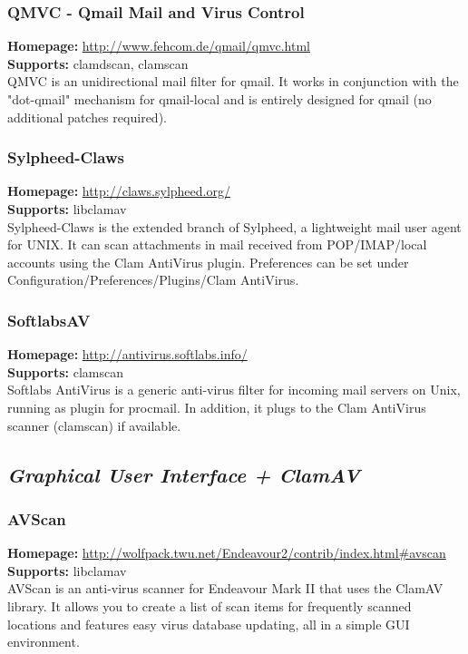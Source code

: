\documentclass[a4paper,titlepage,12pt]{article}
\begin{document}
    \subsubsection{QMVC - Qmail Mail and Virus Control}
    \textbf{Homepage:} \url{http://www.fehcom.de/qmail/qmvc.html}\\
    \textbf{Supports:} clamdscan, clamscan\\[4pt]
    QMVC is an unidirectional mail filter for qmail. It works in conjunction
    with the "dot-qmail" mechanism for qmail-local and is entirely designed
    for qmail (no additional patches required).

    \subsubsection{Sylpheed-Claws}
    \textbf{Homepage:} \url{http://claws.sylpheed.org/}\\
    \textbf{Supports:} libclamav\\[4pt]
    Sylpheed-Claws is the extended branch of Sylpheed, a lightweight mail user
    agent for UNIX. It can scan attachments in mail received from
    POP/IMAP/local accounts using the Clam AntiVirus plugin. Preferences can
    be set under Configuration/Preferences/Plugins/Clam AntiVirus.
 
    \subsubsection{SoftlabsAV}
    \textbf{Homepage:} \url{http://antivirus.softlabs.info/}\\
    \textbf{Supports:} clamscan\\[4pt]
    Softlabs AntiVirus is a generic anti-virus filter for incoming mail
    servers on Unix, running as plugin for procmail. In addition, it plugs
    to the Clam AntiVirus scanner (clamscan) if available.

    \subsection{\emph{Graphical User Interface + ClamAV}}

    \subsubsection{AVScan}
    \textbf{Homepage:} \url{http://wolfpack.twu.net/Endeavour2/contrib/index.html#avscan}\\
    \textbf{Supports:} libclamav\\[4pt]
    AVScan is an anti-virus scanner for Endeavour Mark II that uses the ClamAV
    library. It allows you to create a list of scan items for frequently
    scanned locations and features easy virus database updating, all in
    a simple GUI environment.
\end{document}

